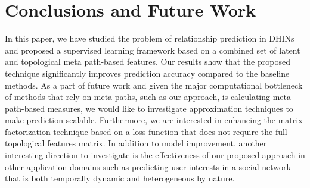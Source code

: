\section{Conclusions and Future Work}

In this paper, we have studied the problem of relationship prediction in DHINs and proposed a supervised learning framework based on a combined set of latent and topological meta path-based features. Our results show that the proposed technique significantly improves prediction accuracy compared to the baseline methods. As a part of future work and given the major computational bottleneck of methods that rely on meta-paths, such as our approach, is calculating meta path-based measures, we would like to investigate approximation techniques to make  prediction scalable. Furthermore, we are interested in enhancing the matrix factorization technique based on a loss function that does not require the full topological features matrix. In addition to model improvement, another interesting direction to investigate is the effectiveness of our proposed approach in other application domains such as predicting user interests in a social network that is both temporally dynamic and heterogeneous by nature. 




